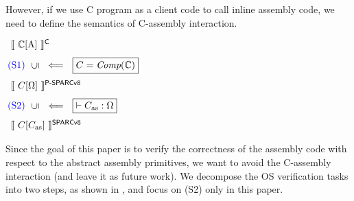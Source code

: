 However, if we use C program as a client code to
call inline assembly code, we need to define the
semantics of C-assembly interaction.
\begin{center}
    $
        \begin{array}{l}
            \semantics{\Clang[\AbsPrimC]}^{\textsf{C}}
            \\
            \\[-5pt]
            \!\!
            {\color{blue} (\text{S1})} \ \
            \rotatebox[origin=c]{90}{$\refine$} \ \
            \Longleftarrow \ \
            \boxed{C = \textit{Comp}(\Clang)}
            \\
            \\[-5pt]
            \semantics{\code[\hprimset]}^{\textsf{P-SPARCv8}}
            \\
            \\[-5pt]
            \!\!
            {\color{blue} (\text{S2})} \ \
            \rotatebox[origin=c]{90}{$\refine$} \ \
            \Longleftarrow \ \
            \boxed{\vdash\asmimp:\hprimset}
            \\
            \\[-5pt]
            \semantics{\code[\asmimp]}^{\textsf{SPARCv8}}
        \end{array}
    $
    \label{fig:idea to establish contextual refinement}
\end{center}

Since the goal of this paper is to verify the correctness of the
assembly code with respect to the abstract assembly primitives,
we want to avoid the C-assembly interaction (and leave it as
future work). We decompose the OS verification tasks into
two steps, as shown in \Fig{\ref{fig:idea to establish contextual refinement}},
and focus on {\color{blue} (S2)} only in this paper.


